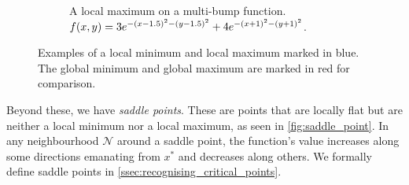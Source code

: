 \begin{figure}[h]
\begin{subfigure}[b]{0.48\linewidth}
        \caption{A local maximum on a multi-bump function. \\

        $f(x,y) = 3 e^{-(x-1.5)^2 - (y-1.5)^2} + \\

         4 e^{-(x+1)^2 - (y+1)^2} $.}

        \label{fig:local_max}

    \end{subfigure}

    \caption{Examples of a local minimum and local maximum marked in blue. The global minimum and global maximum are marked in red for comparison.}

    \label{fig:local_min_max}

\end{figure}



Beyond these, we have \textit{saddle points}. These are points that are locally flat but are neither a local minimum nor a local maximum, as seen in \cref{fig:saddle_point}. In any neighbourhood $\mathcal{N}$ around a saddle point, the function's value increases along some directions emanating from $x^*$ and decreases along others. We formally define saddle points in \cref{ssec:recognising_critical_points}.



